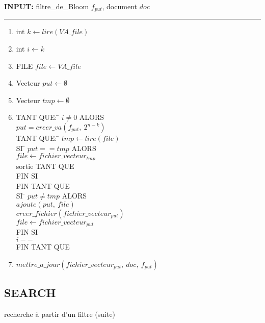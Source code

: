 \documentclass[a4paper,12pt]{report}
\begin{document}
	\begin{flushleft}
		\begin{framed}
			\textbf{INPUT:} filtre\_de\_Bloom $f_{put}$, document $doc$
		\noindent\rule{\linewidth}{0.5pt}

		\begin{enumerate}
			\item int $k \leftarrow lire(VA\_file) $
			\item int $i \leftarrow k$
			\item FILE $file \leftarrow VA\_file$
			\item Vecteur $put \leftarrow \emptyset$
			\item Vecteur $tmp \leftarrow \emptyset$
			\item
			\begin{tabbing}
				TANT QUE: \= $i \neq 0$ ALORS\\
				\> $ put = creer\_va(f_{put},\ 2^{n -k})$\\
				\> TANT QUE: \= $tmp \leftarrow lire(file)$\\
				\> \> SI \= $put == tmp$ ALORS\\
				\> \> \> $file \leftarrow fichier\_vecteur_{tmp}$\\
				\> \> \> sortie TANT QUE\\
				\> \> FIN SI\\
				\> FIN TANT QUE\\
				\> SI \= $put \neq tmp$ ALORS\\
				\> \> $ajoute(put,\ file)$\\
				\> \> $creer\_fichier(fichier\_vecteur_{put})$\\
				\> \> $file \leftarrow fichier\_vecteur_{put}$\\
				\> FIN SI\\
				\> $i--$\\
				FIN TANT QUE
			\end{tabbing}
			\item $mettre\_a\_jour(fichier\_vecteur_{put},\ doc,\ f_{put})$
		\end{enumerate}
		\end{framed}
	\end{flushleft}
	
\subsection{SEARCH}
	\begin{algorithme}
		recherche à partir d'un filtre (suite)
	\end{algorithme} 
	
\end{document}
